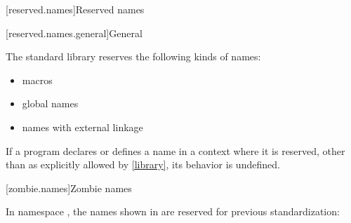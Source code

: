 [reserved.names]{Reserved names}%

[reserved.names.general]{General}%

\pnum
The \Cpp{} standard library reserves the following kinds of names:
\begin{itemize}
\item macros
\item global names
\item names with external linkage
\end{itemize}

\pnum
If a program declares or defines a name in a context where it is
reserved, other than as explicitly allowed by \ref{library}, its behavior is
undefined.%

[zombie.names]{Zombie names}%
%
%
%

\pnum
In namespace , the names shown in  are
reserved for previous standardization:

